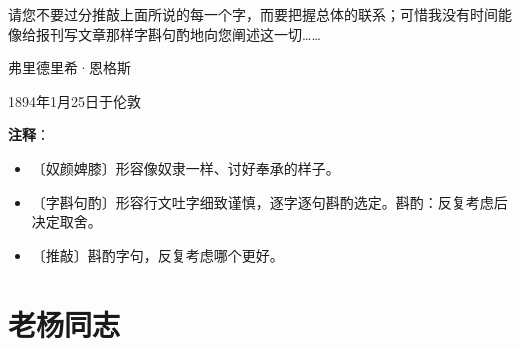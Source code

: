 \documentclass[12pt,UTF-8,openany]{ctexbook}
\begin{document}
\begin{large}
    请您不要过分推敲上面所说的每一个字，而要把握总体的联系；可惜我没有时间能像给报刊写文章那样字斟句酌地向您阐述这一切……
    
    \vspace{36pt}
    
    \begin{flushright}
        弗里德里希·恩格斯
        
        1894年1月25日于伦敦
        
    \end{flushright}
    
    
    
\end{large}


\newpage

\textbf{注释}：

\vspace{-1em}

\begin{itemize}
    \setlength\itemsep{-0.2em}
    \item 〔奴颜婢膝〕形容像奴隶一样、讨好奉承的样子。
    \item 〔字斟句酌〕形容行文吐字细致谨慎，逐字逐句斟酌选定。斟酌：反复考虑后决定取舍。
    \item 〔推敲〕斟酌字句，反复考虑哪个更好。
\end{itemize}

\chapter{老杨同志}
\end{document}
